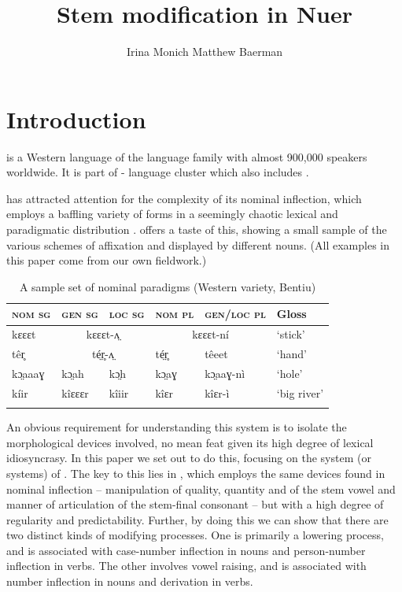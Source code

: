 \documentclass[output=paper
,newtxmath
,modfonts
,nonflat]{langsci/langscibook}
\title{Stem modification in Nuer}
\author{Irina Monich\affiliation{University of Surrey} \lastand  Matthew Baerman\affiliation{University of Surrey}}
\begin{document}
\maketitle

\section{Introduction} %

 is a Western  language of the  language family with almost 900,000 speakers worldwide.  It is part of - language cluster which also includes . 

 has attracted attention for the complexity of its nominal inflection, which employs a baffling variety of forms in a seemingly chaotic lexical and paradigmatic distribution \citep{Frank1999, Baerman2012}.  offers a taste of this, showing a small sample of the various schemes of affixation and  displayed by different nouns. (All examples in this paper come from our own fieldwork.)


\begin{table}
\begin{tabularx}{\textwidth}{XXlXlX}
\lsptoprule
\bfseries\scshape nom sg & \bfseries\scshape gen sg & \bfseries\scshape loc sg & \bfseries\scshape nom pl & \bfseries\scshape gen/loc pl & \bfseries Gloss\\
\midrule
kɛɛɛt & \multicolumn{2}{c}{kɛɛɛt-ʌ̤} & \multicolumn{2}{c}{kɛɛɛt-ní} & ‘stick’\\
têr̥ & \multicolumn{2}{c}{té̤r̥-ʌ̤} & té̤r̥ & têeet & ‘hand’\\
kɔ̤aaaɣ & kɔ̤ah & kɔ̤h & kɔ̤aɣ & kɔ̤aaɣ-nì & ‘hole’\\
kíir & kîɛɛɛr & kîiir & kîɛr & kîɛr-ì & ‘big river’\\
\lspbottomrule
\end{tabularx}
\caption{A sample set of nominal paradigms (Western variety, Bentiu)}
\label{tab:monich:1}
\end{table}

An obvious requirement for understanding this system is to isolate the morphological devices involved, no mean feat given its high degree of lexical idiosyncrasy. In this paper we set out to do this, focusing on the system (or systems) of . The key to this lies in , which employs the same devices found in nominal inflection – manipulation of quality, quantity and  of the stem vowel and manner of articulation of the stem-final consonant – but with a high degree of regularity and predictability. Further, by doing this we can show that there are two distinct kinds of  modifying processes. One is primarily a lowering process, and is associated with case-number inflection in nouns and person-number inflection in verbs. The other involves vowel raising, and is associated with number inflection in nouns and derivation in verbs.
\end{document}
